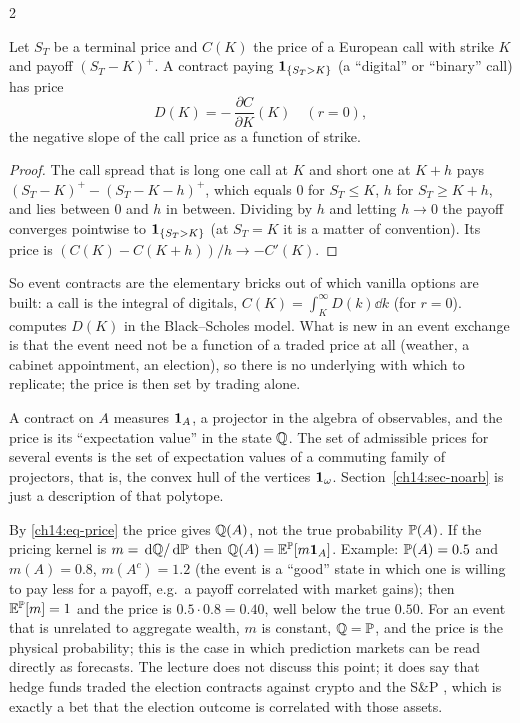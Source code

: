 \begin{paracol}{2}
\begin{proposition}\label{ch14:prop-digital}
Let $S_T$ be a terminal price and $C(K)$ the price of a European call with strike $K$ and payoff
$(S_T-K)^+$. A contract paying $\mathbf{1}_{\{S_T>K\}}$ (a ``digital'' or ``binary'' call) has price
\[
  D(K)=-\,\frac{\partial C}{\partial K}(K)\quad(r=0),
\]
the negative slope of the call price as a function of strike.
\end{proposition}
\begin{proof}
The call spread that is long one call at $K$ and short one at $K+h$ pays $(S_T-K)^+-(S_T-K-h)^+$, which equals $0$
for $S_T\le K$, $h$ for $S_T\ge K+h$, and lies between $0$ and $h$ in between. Dividing by $h$ and letting $h\to0$
the payoff converges pointwise to $\mathbf{1}_{\{S_T>K\}}$ (at $S_T=K$ it is a matter of convention). Its price is
$(C(K)-C(K+h))/h\to -C'(K)$.
\end{proof}

So event contracts are the elementary bricks out of which vanilla options are built: a call is the integral of digitals,
$C(K)=\int_K^\infty D(k)\dd k$ (for $r=0$).  computes $D(K)$ in the Black--Scholes model. What is new
in an event exchange is that the event need not be a function of a traded price at all (weather, a cabinet appointment,
an election), so there is no underlying with which to replicate; the price is then set by trading alone.

\begin{intuition}
A contract on $A$ measures $\mathbf{1}_A$, a projector in the algebra of observables, and the price is its
``expectation value'' in the state $\mathbb{Q}$. The set of admissible prices for several events is the set of
expectation values of a commuting family of projectors, that is, the convex hull of the vertices $\mathbf{1}_\omega$. Section~\ref{ch14:sec-noarb} is
just a description of that polytope.
\end{intuition}

\begin{finance}
By \eqref{ch14:eq-price} the price gives $\mathbb{Q}(A)$, not the true probability $\mathbb{P}(A)$. If the
pricing kernel is $m=\,\mathrm{d}\mathbb{Q}/\,\mathrm{d}\mathbb{P}$ then $\mathbb{Q}(A)=\mathbb{E}^{\mathbb{P}}[m\mathbf{1}_A]$. Example:
$\mathbb{P}(A)=0.5$ and $m(A)=0.8$, $m(A^c)=1.2$ (the event is a ``good'' state in which one is willing to pay less
for a payoff, e.g.\ a payoff correlated with market gains); then $\mathbb{E}^{\mathbb{P}}[m]=1$ and the price is
$0.5\cdot0.8=0.40$, well below the true $0.50$. For an event that is unrelated to aggregate wealth, $m$ is constant,
$\mathbb{Q}=\mathbb{P}$, and the price is the physical probability; this is the case in which prediction markets can be
read directly as forecasts. The lecture does not discuss this point; it does say that hedge funds traded the election
contracts against crypto and the S\&P , which is exactly a bet that the election
outcome is correlated with those assets.
\end{finance}


\end{paracol}
